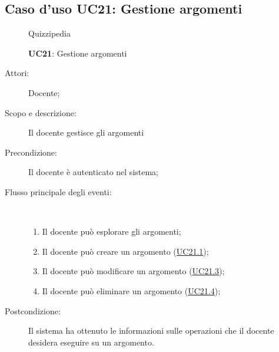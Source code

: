 \subsection{Caso d'uso UC21: Gestione argomenti}
	\begin{figure}[H]
		\centering
		\begin{resizedtikzpicture}{\textwidth}
		\begin{umlsystem}[x=0, fill=lightgray!20]{Quizzipedia}
		\end{umlsystem}
		\end{resizedtikzpicture}
		\caption{\textbf{UC21}: Gestione argomenti}
		\label{UC21}
	\end{figure}
\begin{description}
\item[Attori:] Docente;
\item[Scopo e descrizione:] Il docente gestisce gli argomenti
      \item[Precondizione:] Il docente è autenticato nel sistema;

        \item[Flusso principale degli eventi:] \ 
 \begin{enumerate}
          \item Il docente può esplorare gli argomenti;
          \item Il docente può creare un argomento (\hyperlink{UC21.1}{UC21.1});
          \item Il docente può modificare un argomento (\hyperlink{UC21.3}{UC21.3});
          \item Il docente può eliminare un argomento (\hyperlink{UC21.4}{UC21.4});

      \end{enumerate}
    \item[Postcondizione:] Il sistema ha ottenuto le informazioni sulle operazioni che il docente desidera eseguire su un argomento.
  \end{description}
\hypertarget{UC21.1}{}
